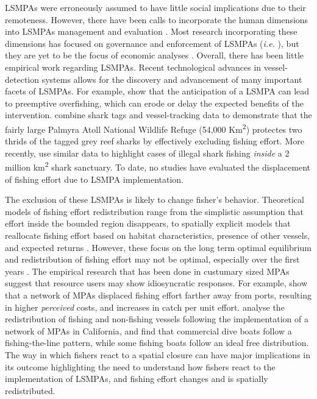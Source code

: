 \documentclass[11pt,]{article}
\begin{document}
LSMPAs were erroneously assumed to have little social implications due
to their remoteness. However, there have been calls to incorporate the
human dimensions into LSMPAs management and evaluation
\citep{agardy_2011,gray_2017}. Most research incorporating these
dimensions has focused on governance and enforcement of LSMPAs
(\emph{i.e.} \citet{alger_2017,christie_2017}), but they are yet to be
the focus of economic analyses \citep{gray_2017}. Overall, there has
been little empirical work regarding LSMPAs. Recent technological
advances in vessel-detection systems allows for the discovery and
advancement of many important facets of LSMPAs. For example,
\citep{mcdermott_2018} show that the anticipation of a LSMPA can lead to
preemptive overfishing, which can erode or delay the expected benefits
of the intervention. \citet{white_2017} combine shark tags and
vessel-tracking data to demonstrate that the fairly large Palmyra Atoll
National Wildlife Refuge (54,000 Km\textsuperscript{2}) protectes two
thrids of the tagged grey reef sharks by effectively excluding fishing
effort. More recently, \citep{bradley_2018} use similar data to
highlight cases of illegal shark fishing \emph{inside} a 2 million
km\textsuperscript{2} shark sanctuary. To date, no studies have
evaluated the displacement of fishing effort due to LSMPA
implementation.

The exclusion of these LSMPAs is likely to change fisher's behavior.
Theoretical models of fishing effort redistribution range from the
simplistic assumption that effort inside the bounded region disappears,
to spatially explicit models that reallocate fishing effort based on
habitat characteristics, presence of other vessels, and expected returns
\citep{smith_2003,hilborn_2006}. However, these focus on the long term
optimal equilibrium and redistribution of fishing effort may not be
optimal, especially over the first years \citep{stevenson_2013}. The
empirical research that has been done in custumary sized MPAs suggest
that resource users may show idiosyncratic responses. For example,
\citet{stevenson_2013} show that a network of MPAs displaced fishing
effort farther away from ports, resulting in higher \emph{perceived}
costs, and increases in catch per unit effort. \citet{cabral_2017}
analyse the redistribution of fishing and non-fishing vessels following
the implementation of a network of MPAs in California, and find that
commercial dive boats follow a fishing-the-line pattern, while some
fishing boats follow an ideal free distribution. The way in which
fishers react to a spatial closure can have major implications in its
outcome \citep{smith_2003,hilborn_2006} highlighting the need to
understand how fishers react to the implementation of LSMPAs, and
fishing effort changes and is spatially redistributed.
\end{document}
